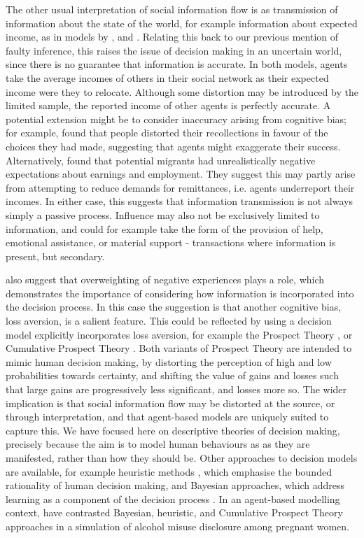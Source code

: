 \documentclass{article}
\begin{document}
The other usual interpretation of social information flow is as transmission of information about the state of the world, for example information about expected income, as in models by \citet{Filho2011}, and \citet{Klabunde2014}.  Relating this back to our previous mention of faulty inference, this raises the issue of decision making in an uncertain world, since there is no guarantee that information is accurate. In both models, agents take the average incomes of others in their social network as their expected income were they to relocate. Although some distortion may be introduced by the limited sample, the reported income of other agents is perfectly accurate. 
A potential extension might be to consider inaccuracy arising from cognitive bias; for example, \citet{Mather2000} found that people distorted their recollections in favour of the choices they had made, suggesting that agents might exaggerate their success. Alternatively, \citet{McKenzie2013} found that potential migrants had unrealistically negative expectations about earnings and employment. They suggest this may partly arise from attempting to reduce demands for remittances, i.e. agents underreport their incomes. In either case, this suggests that information transmission is not always simply a passive process. Influence may also not be exclusively limited to information, and could for example take the form of the provision of help, emotional assistance, or material support - transactions where information is present, but secondary.

\citeauthor{McKenzie2013} also suggest that overweighting of negative experiences plays a role, which demonstrates the importance of considering how information is incorporated into the decision process. In this case the suggestion is that another cognitive bias, loss aversion, is a salient feature. This could be reflected by using a decision model explicitly incorporates loss aversion, for example the Prospect Theory \citep{Kahneman1979}, or Cumulative Prospect Theory \citep{Tversky1992}. Both variants of Prospect Theory are intended to mimic human decision making, by distorting the perception of high and low probabilities towards certainty, and shifting the value of gains and losses such that large gains are progressively less significant, and losses more so. 
The wider implication is that social information flow may be distorted at the source, or through interpretation, and that agent-based models are uniquely suited to capture this.  We have focused here on descriptive theories of decision making, precisely because the aim is to model human behaviours as as they are manifested, rather than how they should be. Other approaches to decision models are available, for example heuristic methods \citep{Gigerenzer1996}, which emphasise the bounded rationality of human decision making, and Bayesian approaches, which address learning as a component of the decision process \citep{Robbins1964}. In an agent-based modelling context, \citet{Gray2016} have contrasted Bayesian, heuristic, and Cumulative Prospect Theory approaches in a simulation of alcohol misuse disclosure among pregnant women.
\end{document}
